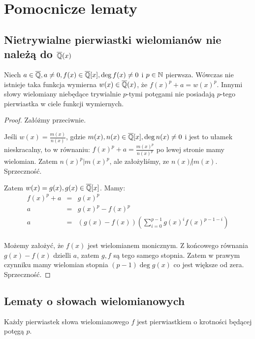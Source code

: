 \chapter{Pomocnicze lematy}
\section{Nietrywialne pierwiastki wielomianów nie należą do $\overline{\mathbb{Q}}(x)$}
\begin{lemma}
  Niech $a \in \overline{\mathbb{Q}}, a \neq 0, f(x) \in \overline{\mathbb{Q}}[x], \deg f(x)
  \neq 0$ i $p \in \mathbb{N}$ pierwsza.  Wówczas nie istnieje taka funkcja wymierna
  $w(x) \in \overline{\mathbb{Q}}(x)$, że $f(x)^{p} + a = w(x)^p$. Innymi słowy
  wielomiany niebędące trywialnie $p$-tymi potęgami nie posiadają $p$-tego
  pierwiastka w ciele funkcji wymiernych.
\end{lemma}

\begin{proof}
Załóżmy przeciwnie.

Jeśli $w(x) = \frac{m(x)}{n(x)}$, gdzie $m(x), n(x) \in \overline{\mathbb{Q}}[x], \deg
n(x) \neq 0$ i jest to ułamek nieskracalny, to w równaniu: $f(x)^{p} + a =
\frac{m(x)^p}{n(x)^p}$ po lewej stronie mamy wielomian. Zatem $n(x)^p | m(x)^p$,
ale założyliśmy, ze $n(x) \! \not| m(x)$. Sprzeczność.

Zatem $w(x) = g(x), g(x) \in \overline{\mathbb{Q}}[x]$. Mamy:
\begin{eqnarray*}
  f(x)^p + a &=& g(x)^p \\
  a &=& g(x)^p - f(x)^p\\
  a &=& \left(g(x) - f(x)\right)\left(\sum_{i=0}^{p-1}g(x)^if(x)^{p-1 - i}\right)\\
\end{eqnarray*}

Możemy założyć, że $f(x)$ jest wielomianem monicznym. Z końcowego równania $g(x)
- f(x)$ dzielli $a$, zatem $g, f$ są tego samego stopnia. Zatem w prawym
czynniku mamy wielomian stopnia $(p-1)\deg g(x)$ co jest większe od zera.
Sprzeczność.
\end{proof}

\section{Lematy o słowach wielomianowych} 
\begin{lemma}
  Każdy pierwiastek słowa wielomianowego $f$ jest pierwiastkiem o krotności
  będącej potęgą $p$.
\end{lemma}

